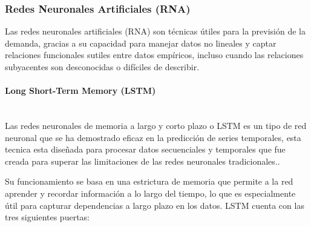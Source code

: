 \subsubsection{Redes Neuronales Artificiales (RNA)}
Las redes neuronales artificiales (RNA) son técnicas útiles para la previsión de la demanda, gracias a su capacidad para manejar datos no lineales y captar relaciones funcionales sutiles entre datos empíricos, incluso cuando las relaciones subyacentes son desconocidas o difíciles de describir.

    \paragraph{Long Short-Term Memory (LSTM)}\mbox{}\\
    Las redes neuronales de memoria a largo y corto plazo o LSTM es un tipo de red neuronal que se ha demostrado eficaz en la predicción de series temporales, esta tecnica esta diseñada para procesar datos secuenciales y temporales que fue creada para superar las limitaciones de las redes neuronales tradicionales.\cite{10124729}.

    Su funcionamiento se basa en una estrictura de memoria que permite a la red aprender y recordar información a lo largo del tiempo, lo que es especialmente útil para capturar dependencias a largo plazo en los datos. LSTM cuenta con las tres siguientes puertas: 

